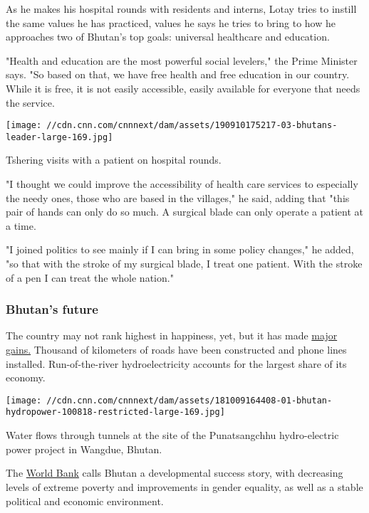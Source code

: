 As he makes his hospital rounds with residents and interns, Lotay tries
to instill the same values he has practiced, values he says he tries to
bring to how he approaches two of Bhutan's top goals: universal
healthcare and education.

"Health and education are the most powerful social levelers," the Prime
Minister says. "So based on that, we have free health and free education
in our country. While it is free, it is not easily accessible, easily
available for everyone that needs the service.

\texttt{[image: //cdn.cnn.com/cnnnext/dam/assets/190910175217-03-bhutans-leader-large-169.jpg]}

Tshering visits with a patient on hospital rounds.

"I thought we could improve the accessibility of health care services to
especially the needy ones, those who are based in the villages," he
said, adding that "this pair of hands can only do so much. A surgical
blade can only operate a patient at a time.

"I joined politics to see mainly if I can bring in some policy changes,"
he added, "so that with the stroke of my surgical blade, I treat one
patient. With the stroke of a pen I can treat the whole nation."

\hypertarget{bhutans-future}{%
\subsubsection{Bhutan's future}\label{bhutans-future}}

The country may not rank highest in happiness, yet, but it has made
\href{http://habitat3.org/wp-content/uploads/Bhutan_Habitat-III-National-Report.pdf}{major
gains.} Thousand of kilometers of roads have been constructed and phone
lines installed. Run-of-the-river hydroelectricity accounts for the
largest share of its economy.

\texttt{[image: //cdn.cnn.com/cnnnext/dam/assets/181009164408-01-bhutan-hydropower-100818-restricted-large-169.jpg]}

Water flows through tunnels at the site of the Punatsangchhu
hydro-electric power project in Wangdue, Bhutan.

The \href{https://www.worldbank.org/en/country/bhutan/overview}{World
Bank} calls Bhutan a developmental success story, with decreasing levels
of extreme poverty and improvements in gender equality, as well as a
stable political and economic environment.

